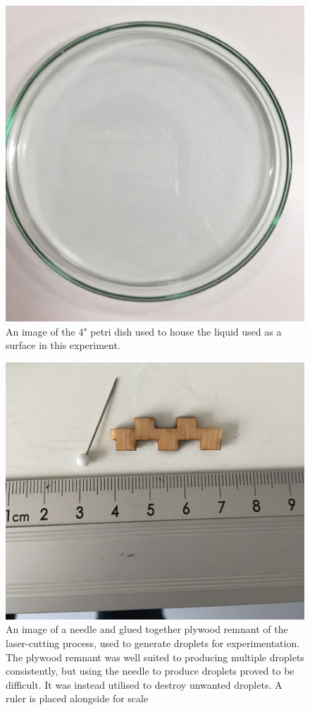 \begin{figure}[ht]
\includegraphics[width=12cm]{prototype/exp_rep_imgs/petriDish.jpg}
\centering
\caption{An image of the 4" petri dish used to house the liquid used as a surface in this experiment.}
\centering
\label{fig:PetriDish}
\end{figure}

\begin{figure}[ht]
\includegraphics[width=12cm]{prototype/exp_rep_imgs/DropletCreators.jpg}
\centering
\caption{An image of a needle and glued together plywood remnant of the laser-cutting process, used to generate droplets for experimentation.  The plywood remnant was well suited to producing multiple droplets consistently, but using the needle to produce droplets proved to be difficult. It was instead utilised to destroy unwanted droplets. A ruler is placed alongside for scale  }
\centering
\label{fig:DropletCreators}
\end{figure}

